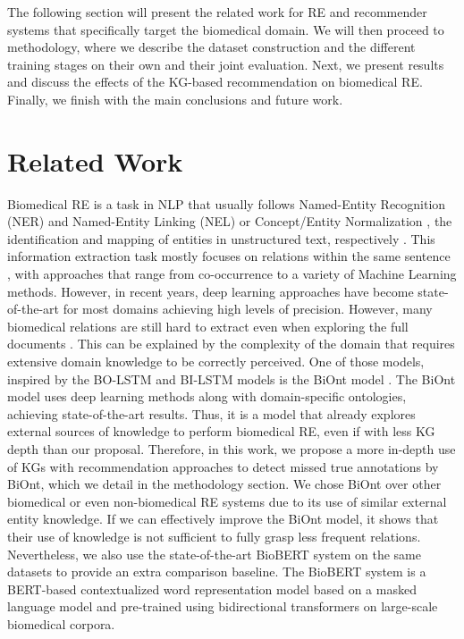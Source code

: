 The following section will present the related work for RE and recommender systems that specifically target the biomedical domain. We will then proceed to methodology, where we describe the dataset construction and the different training stages on their own and their joint evaluation. Next, we present results and discuss the effects of the KG-based recommendation on biomedical RE. Finally, we finish with the main conclusions and future work. 


\section{Related Work}

Biomedical RE is a task in NLP that usually follows Named-Entity Recognition (NER) and Named-Entity Linking (NEL) or Concept/Entity Normalization \citep{funk2014large}, the identification and mapping of entities in unstructured text, respectively \citep{sousa2021using}. This information extraction task mostly focuses on relations within the same sentence \citep{PMID:32032717}, with approaches that range from co-occurrence to a variety of Machine Learning methods. However, in recent years, deep learning approaches have become state-of-the-art for most domains achieving high levels of precision.
However, many biomedical relations are still hard to extract even when exploring the full documents \citep{verga-etal-2018-simultaneously}.
This can be explained by the complexity of the domain that requires extensive domain knowledge to be correctly perceived. 
One of those models, inspired by the BO-LSTM and BI-LSTM models \citep{lamurias2019bo,xu2018leveraging} is the BiOnt model \citep{sousa2020biont}. The BiOnt model uses deep learning methods along with domain-specific ontologies, achieving state-of-the-art results. Thus, it is a model that already explores external sources of knowledge to perform biomedical RE, even if with less KG depth than our proposal. Therefore, in this work, we propose a more in-depth use of KGs with recommendation approaches to detect missed true annotations by BiOnt, which we detail in the methodology section. We chose BiOnt over other biomedical or even non-biomedical \citep{devlin2019bert,gu2021domain} RE systems \citep{lee2020biobert} due to its use of similar external entity knowledge. If we can effectively improve the BiOnt model, it shows that their use of knowledge is not sufficient to fully grasp less frequent relations. Nevertheless, we also use the state-of-the-art BioBERT system \citep{lee2020biobert} on the same datasets to provide an extra comparison baseline. The BioBERT system is a BERT-based contextualized word representation model based on a masked language model and pre-trained using bidirectional transformers on large-scale biomedical corpora. 

